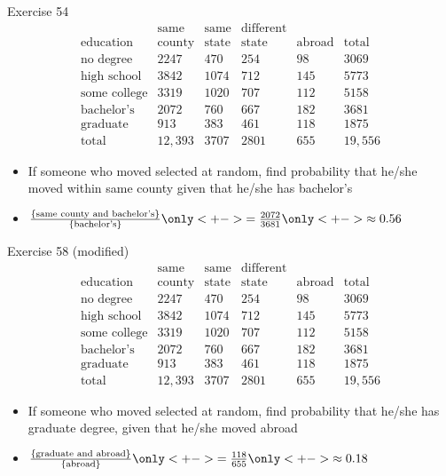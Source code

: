 \documentclass[handout]{beamer}
\theoremstyle{definition}
\begin{document}
\begin{frame}{Exercise 54}
\[\begin{array}{r|llll|l}
&\text{same}&\text{same}&\text{different}&&\\
\text{education}&\text{county}
&\text{state}&\text{state}&\text{abroad}&\text{total}\\\hline
\text{no degree}&2247&470&254&98&3069\\
\text{high school}&3842&1074&712&145&5773\\
\text{some college}&3319&1020&707&112&5158\\
\text{bachelor's}&2072&760&667&182&3681\\
\text{graduate}&913&383&461&118&1875\\\hline
\text{total}&12,393&3707&2801&655&19,556
\end{array}\]
\begin{itemize}
\item If someone who moved selected at random, find probability
that he/she moved within same county given that he/she has bachelor's
\item $\frac{\left\{\text{same county and bachelor's}\right\}}
{\left\{\text{bachelor's}\right\}}
\only<+->{=\frac{2072}{3681}}\only<+->{\approx 0.56}$
\end{itemize}
\end{frame}

\begin{frame}{Exercise 58 (modified)}
\[\begin{array}{r|llll|l}
&\text{same}&\text{same}&\text{different}&&\\
\text{education}&\text{county}
&\text{state}&\text{state}&\text{abroad}&\text{total}\\\hline
\text{no degree}&2247&470&254&98&3069\\
\text{high school}&3842&1074&712&145&5773\\
\text{some college}&3319&1020&707&112&5158\\
\text{bachelor's}&2072&760&667&182&3681\\
\text{graduate}&913&383&461&118&1875\\\hline
\text{total}&12,393&3707&2801&655&19,556
\end{array}\]
\begin{itemize}
\item If someone who moved selected at random, find probability
that he/she has graduate degree, given that he/she moved abroad
\item $\frac{\left\{\text{graduate and abroad}\right\}}
{\left\{\text{abroad}\right\}}
\only<+->{=\frac{118}{655}}\only<+->{\approx 0.18}$
\end{itemize}
\end{frame}
\end{document}
